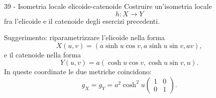 \documentclass[a4paper]{article}
\begin{document}
\begin{snippetexercise}{39 - Isometria locale elicoide-catenoide}
    Costruire un'isometria locale
    \[
        h\colon X\longrightarrow Y
    \]
    fra l'elicoide e il catenoide degli esercizi precedenti.

    Suggerimento: riparametrizzare l'elicoide nella forma
    \[
        X(u,v)=
        \left(
            a\sinh u\cos v,
            a\sinh u\sin v,
            av
        \right),
    \]
    e il catenoide nella forma
    \[
        Y(u,v)=
        a\left(
            \cosh u\cos v,
            \cosh u\sin v,
            u
        \right).
    \]
    In queste coordinate le due metriche coincidono:
    \[
        g_X=g_Y=a^2\cosh^2 u
        \begin{pmatrix}
            1 & 0\\
            0 & 1
        \end{pmatrix}.
    \]
\end{snippetexercise}
\end{document}
